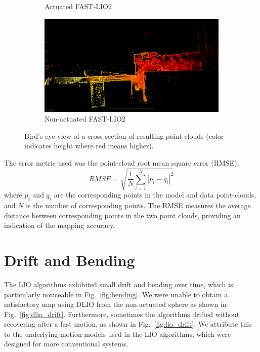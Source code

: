 \documentclass[english, bachelor, utf8]{base/thesis_telematics}
\begin{document}
\begin{figure}[t]
\begin{subfigure}{0.492\columnwidth}
        \caption{Actuated FAST-LIO2}
        \label{fig:act_fast_lio_top}\end{subfigure}
\hfill
\begin{subfigure}{0.492\columnwidth}
        \centering
        \includegraphics[width=\textwidth]{pics/eagle_view/non_lio_top.png}
        \caption{Non-actuated FAST-LIO2}
        \label{fig:non_act_fast_lio_top}
\end{subfigure}
\caption{Bird's-eye view of a cross section of resulting point-clouds (color indicates height where red means higher).}\vspace{-1mm}
\end{figure}

The error metric used was the point-cloud root mean square error (RMSE).
\begin{equation}
    RMSE = \sqrt{\frac{1}{N} \sum_{i=1}^{N} |p_i - q_i|^2}
\end{equation}
where \( p_i \) and \( q_i \) are the corresponding points in the model and data point-clouds, and \( N \) is the number of corresponding points. 
The RMSE measures the average distance between corresponding points in the two point clouds, providing an indication of the mapping accuracy.


\section{Drift and Bending}
The LIO algorithms exhibited small drift and bending over time, which is particularly noticeable in Fig.~\ref{fig:bending}. 
We were unable to obtain a satisfactory map using DLIO from the non-actuated sphere as shown in Fig.~\ref{fig:dlio_drift}.
Furthermore, sometimes the algorithms drifted without recovering after a fast motion, as shown in Fig.~\ref{fig:lio_drift}. 
We attribute this to the underlying motion models used in the LIO algorithms, which were designed for more conventional systems.
\end{document}
